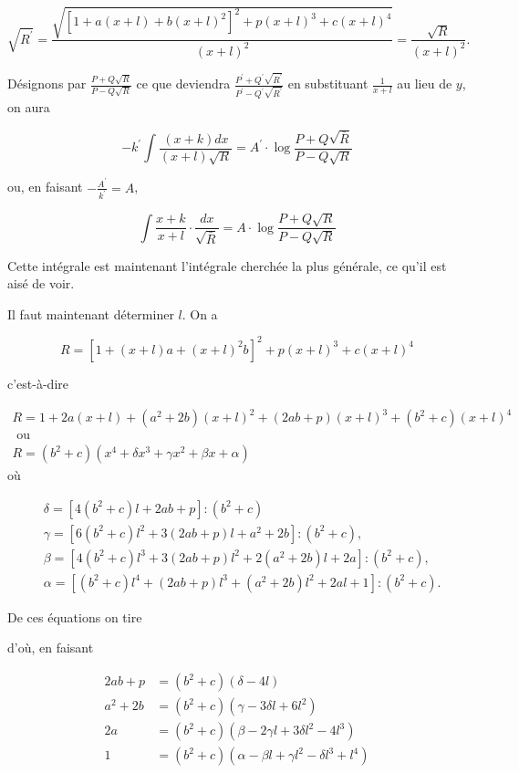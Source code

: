 \documentclass{article}
\begin{document}
\[
\sqrt{R^{\prime}}=\frac{\sqrt{\left[1+a(x+l)+b(x+l)^{2}\right]^{2}+p(x+l)^{3}+c(x+l)^{4}}}{(x+l)^{2}}=\frac{\sqrt{R}}{(x+l)^{2}} .
\]

Désignons par \(\frac{P+Q \sqrt{R}}{P-Q \sqrt{R}}\) ce que deviendra \(\frac{P^{\prime}+Q^{\prime} \sqrt{R^{\prime}}}{P^{\prime}-Q^{\prime} \sqrt{R^{\prime}}}\) en substituant \(\frac{1}{x+l}\) au lieu de \(y\), on aura

\[
-k^{\prime} \int \frac{(x+k) d x}{(x+l) \sqrt{R}}=A^{\prime} \cdot \log \frac{P+Q \sqrt{\bar{R}}}{P-Q \sqrt{R}}
\]

ou, en faisant \(-\frac{A^{\prime}}{k^{\prime}}=A\),

\[
\int \frac{x+k}{x+l} \cdot \frac{d x}{\sqrt{\bar{R}}}=A \cdot \log \frac{P+Q \sqrt{R}}{P-Q \sqrt{R}}
\]

Cette intégrale est maintenant l'intégrale cherchée la plus générale, ce qu'il est aisé de voir.

Il faut maintenant déterminer \(l\). On a

\[
R=\left[1+(x+l) a+(x+l)^{2} b\right]^{2}+p(x+l)^{3}+c(x+l)^{4}
\]

c'est-à-dire

\[
\begin{gathered}
R=1+2 a(x+l)+\left(a^{2}+2 b\right)(x+l)^{2}+(2 a b+p)(x+l)^{3}+\left(b^{2}+c\right)(x+l)^{4} \\
\text { ou } \\
R=\left(b^{2}+c\right)\left(x^{4}+\delta x^{3}+\gamma x^{2}+\beta x+\alpha\right)
\end{gathered}
\]
où

\[
\begin{aligned}
& \delta=\left[4\left(b^{2}+c\right) l+2 a b+p\right]:\left(b^{2}+c\right) \\
& \gamma=\left[6\left(b^{2}+c\right) l^{2}+3(2 a b+p) l+a^{2}+2 b\right]:\left(b^{2}+c\right), \\
& \beta=\left[4\left(b^{2}+c\right) l^{3}+3(2 a b+p) l^{2}+2\left(a^{2}+2 b\right) l+2 a\right]:\left(b^{2}+c\right), \\
& \alpha=\left[\left(b^{2}+c\right) l^{4}+(2 a b+p) l^{3}+\left(a^{2}+2 b\right) l^{2}+2 a l+1\right]:\left(b^{2}+c\right) .
\end{aligned}
\]

De ces équations on tire

d'où, en faisant

\[
\begin{aligned}
2 a b+p & =\left(b^{2}+c\right)(\delta-4 l) \\
a^{2}+2 b & =\left(b^{2}+c\right)\left(\gamma-3 \delta l+6 l^{2}\right) \\
2 a & =\left(b^{2}+c\right)\left(\beta-2 \gamma l+3 \delta l^{2}-4 l^{3}\right) \\
1 & =\left(b^{2}+c\right)\left(\alpha-\beta l+\gamma l^{2}-\delta l^{3}+l^{4}\right)
\end{aligned}
\]
\end{document}
